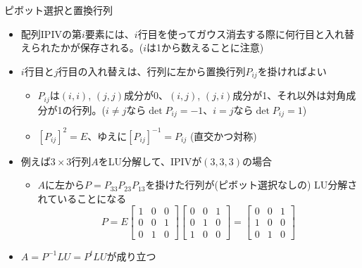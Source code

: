 \begin{frame}[t,fragile]{ピボット選択と置換行列}
  \begin{itemize}
  \item 配列IPIVの第$i$要素には、$i$行目を使ってガウス消去する際に何行目と入れ替えられたかが保存される。($i$は1から数えることに注意)
  \item $i$行目と$j$行目の入れ替えは、行列に左から置換行列$P_{ij}$を掛ければよい
    \begin{itemize}
    \item $P_{ij}$は$(i,i)$, $(j,j)$成分が0、$(i,j)$, $(j,i)$成分が1、それ以外は対角成分が1の行列。($i \ne j$なら$\det P_{ij} = -1$、$i = j$なら$\det P_{ij} = 1$)
    \item $[P_{ij}]^2=E$、ゆえに$[P_{ij}]^{-1}=P_{ij}$ (直交かつ対称)
    \end{itemize}
  \item 例えば$3 \times 3$行列$A$をLU分解して、IPIVが$(3,3,3)$の場合
    \begin{itemize}
    \item $A$に左から$P=P_{33}P_{23}P_{13}$を掛けた行列が(ピボット選択なしの) LU分解されていることになる
      \[
      P = E \begin{bmatrix} 1 & 0 & 0 \\ 0 & 0 & 1 \\ 0 & 1 & 0 \end{bmatrix} \begin{bmatrix} 0 & 0 & 1 \\ 0 & 1 & 0 \\ 1 & 0 & 0 \end{bmatrix} = \begin{bmatrix} 0 & 0 & 1 \\ 1 & 0 & 0 \\ 0 & 1 & 0 \end{bmatrix}
      \]
    \end{itemize}
  \item $A = P^{-1}LU = P^{t} LU$が成り立つ
  \end{itemize}
\end{frame}
